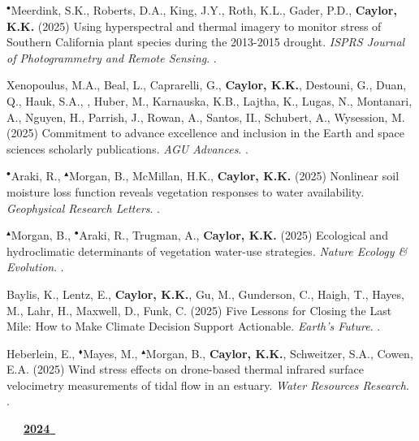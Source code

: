 \begin{etaremune}
\item $^{\bullet}$Meerdink, S.K., Roberts, D.A., King, J.Y., Roth, K.L., Gader, P.D., \textbf{ Caylor, K.K.} (2025) Using hyperspectral and thermal imagery to monitor stress of Southern California plant species during the 2013-2015 drought. \emph{ISPRS Journal of Photogrammetry and Remote Sensing}. .
\item Xenopoulus, M.A., Beal, L., Caprarelli, G., \textbf{ Caylor, K.K.}, Destouni, G., Duan, Q., Hauk, S.A., , Huber, M., Karnauska, K.B., Lajtha, K., Lugas, N., Montanari, A., Nguyen, H., Parrish, J., Rowan, A., Santos, II., Schubert, A., Wysession, M. (2025) Commitment to advance excellence and inclusion in the Earth and space sciences scholarly publications. \emph{AGU Advances}. .
\item $^{\bullet}$Araki, R., $^{\blacktriangle}$Morgan, B., McMillan, H.K., \textbf{ Caylor, K.K.} (2025) Nonlinear soil moisture loss function reveals vegetation responses to water availability. \emph{Geophysical Research Letters}. .
\item $^{\blacktriangle}$Morgan, B., $^{\bullet}$Araki, R., Trugman, A., \textbf{ Caylor, K.K.} (2025) Ecological and hydroclimatic determinants of vegetation water-use strategies. \emph{Nature Ecology \& Evolution}. .
\item Baylis, K., Lentz, E., \textbf{ Caylor, K.K.}, Gu, M., Gunderson, C., Haigh, T., Hayes, M., Lahr, H., Maxwell, D., Funk, C. (2025) Five Lessons for Closing the Last Mile: How to Make Climate Decision Support Actionable. \emph{Earth's Future}. .
\item Heberlein, E., $^{\blacklozenge}$Mayes, M., $^{\blacktriangle}$Morgan, B., \textbf{ Caylor, K.K.}, Schweitzer, S.A., Cowen, E.A. (2025) Wind stress effects on drone-based thermal infrared surface velocimetry measurements of tidal flow in an estuary. \emph{Water Resources Research}. .

\vspace{0.1in}
\mbox{\ \ \ \underline{\textbf{2024 }}}
\vspace{0.1in}


\end{etaremune}
